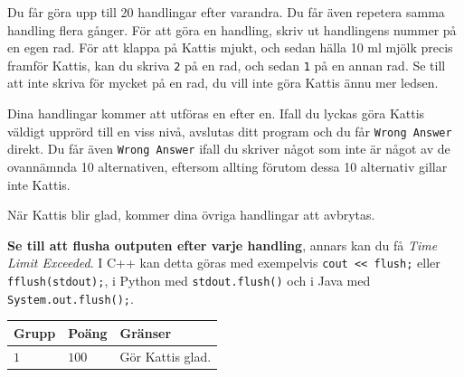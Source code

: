 Du får göra upp till 20 handlingar efter varandra. Du får även repetera samma handling flera gånger.
För att göra en handling, skriv ut handlingens nummer på en egen rad. För att klappa på Kattis mjukt, 
och sedan hälla 10 ml mjölk precis framför Kattis, kan du skriva \texttt{2} på en rad, och sedan \texttt{1} på en annan rad.
Se till att inte skriva för mycket på en rad, du vill inte göra Kattis ännu mer ledsen. 

Dina handlingar kommer att utföras en efter en. Ifall du lyckas göra Kattis väldigt upprörd till en viss nivå, 
avslutas ditt program och du får \texttt{Wrong Answer} direkt. 
Du får även \texttt{Wrong Answer} ifall du skriver något som inte är något av de ovannämnda 10 alternativen, 
eftersom allting förutom dessa 10 alternativ gillar inte Kattis.

När Kattis blir glad, kommer dina övriga handlingar att avbrytas.

\textbf{Se till att flusha outputen efter varje handling}, annars kan du få \textit{Time Limit Exceeded}.
I C++ kan detta göras med exempelvis \texttt{cout << flush;}
eller \texttt{fflush(stdout);},
i Python med \texttt{stdout.flush()}
och i Java med \texttt{System.out.flush();}.


\noindent
\begin{tabular}{| l | l | l |}
  \hline
  \textbf{Grupp} & \textbf{Poäng} & \textbf{Gränser} \\ \hline
  $1$   & $100$        & Gör Kattis glad. \\ \hline
\end{tabular}
